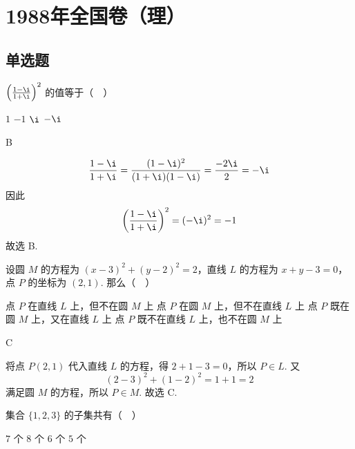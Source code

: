 \chapter{1988年全国卷（理）}

\section{单选题}

\begin{problem}

\(\left(\frac{1 - \i}{1 + \i}\right)^2\) 的值等于（\(\quad\)）

\choices
    {\(1\)}
    {\(-1\)}
    {\(\i\)}
    {\(-\i\)}
\end{problem}

\begin{answer}
B
\end{answer}

\begin{solution}
\[
\frac{1-\i}{1+\i}=\frac{(1-\i)^2}{(1+\i)(1-\i)}=\frac{-2\i}{2}=-\i
\]
因此
\[
\left(\frac{1-\i}{1+\i}\right)^2=(-\i)^2=-1
\]
故选 B.
\end{solution}


\begin{problem}

设圆 \(M\) 的方程为 \((x - 3)^2 + (y - 2)^2 = 2\)，直线 \(L\) 的方程为 \(x + y - 3 = 0\)，点 \(P\) 的坐标为 \((2,1)\). 那么（\(\quad\)）

\choices
    {点 \(P\) 在直线 \(L\) 上，但不在圆 \(M\) 上}
    {点 \(P\) 在圆 \(M\) 上，但不在直线 \(L\) 上}
    {点 \(P\) 既在圆 \(M\) 上，又在直线 \(L\) 上}
    {点 \(P\) 既不在直线 \(L\) 上，也不在圆 \(M\) 上}
\end{problem}

\begin{answer}
C
\end{answer}

\begin{solution}
将点 \(P(2,1)\) 代入直线 \(L\) 的方程，得 \(2+1-3=0\)，所以 \(P\in L\). 又
\[
(2-3)^2+(1-2)^2=1+1=2
\]
满足圆 \(M\) 的方程，所以 \(P\in M\). 故选 C.
\end{solution}

\begin{problem}

集合 \(\{1,2,3\}\) 的子集共有（\(\quad\)）

\choices
    {\(7\) 个}
    {\(8\) 个}
    {\(6\) 个}
    {\(5\) 个}
\end{problem}

